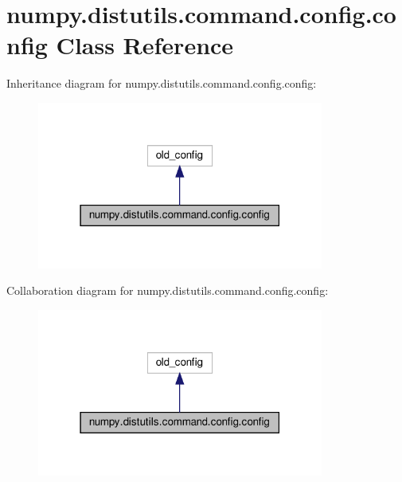\hypertarget{classnumpy_1_1distutils_1_1command_1_1config_1_1config}{}\section{numpy.\+distutils.\+command.\+config.\+config Class Reference}
\label{classnumpy_1_1distutils_1_1command_1_1config_1_1config}


Inheritance diagram for numpy.\+distutils.\+command.\+config.\+config\+:
\nopagebreak
\begin{figure}[H]
\begin{center}
\leavevmode
\includegraphics[width=267pt]{classnumpy_1_1distutils_1_1command_1_1config_1_1config__inherit__graph}
\end{center}
\end{figure}


Collaboration diagram for numpy.\+distutils.\+command.\+config.\+config\+:
\nopagebreak
\begin{figure}[H]
\begin{center}
\leavevmode
\includegraphics[width=267pt]{classnumpy_1_1distutils_1_1command_1_1config_1_1config__coll__graph}
\end{center}
\end{figure}
